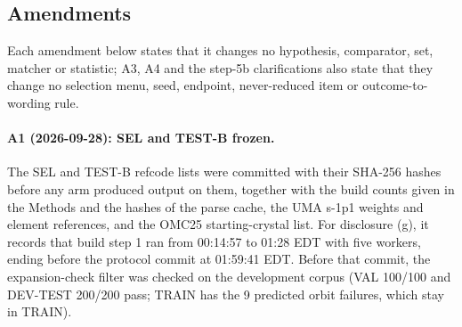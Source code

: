 \subsection{Amendments}\label{si:amendments}

Each amendment below states that it changes no hypothesis, comparator, set,
matcher or statistic; A3, A4 and the step-5b clarifications also state that they
change no selection menu, seed, endpoint, never-reduced item or
outcome-to-wording rule.

\paragraph{A1 (2026-09-28): SEL and TEST-B frozen.} The SEL and TEST-B refcode lists
were committed with their SHA-256 hashes before any arm produced output on
them, together with the build counts given in the Methods and the hashes of the
parse cache, the UMA s-1p1 weights and element references, and the OMC25
starting-crystal list. For disclosure (g), it records that build step 1 ran from
00:14:57 to 01:28 EDT with five workers, ending before the protocol commit at
01:59:41 EDT. Before that commit, the expansion-check filter was checked on the
development corpus (VAL 100/100 and DEV-TEST 200/200 pass; TRAIN has the 9
predicted orbit failures, which stay in TRAIN).

